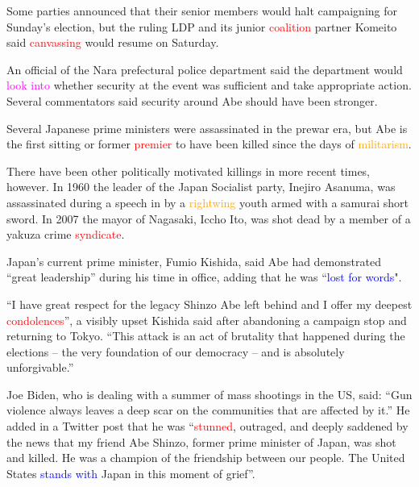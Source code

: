 \documentclass[12pt,a4paper]{article}
\begin{document}
    \par Some parties announced that their senior members would halt campaigning for Sunday’s election, but the ruling LDP and its junior \textcolor{red}{coalition}\cite{coalition} partner Komeito said \textcolor{red}{canvassing}\cite{canvassing} would resume on Saturday.

    \par An official of the Nara prefectural police department said the department would \textcolor{magenta}{look into}\cite{look_into} whether security at the event was sufficient and take appropriate action. Several commentators said security around Abe should have been stronger.






    \par Several Japanese prime ministers were assassinated in the prewar era, but Abe is the first sitting or former \textcolor{red}{premier}\cite{premier} to have been killed since the days of \textcolor{orange}{militarism}\cite{militarism}.

    \par There have been other politically motivated killings in more recent times, however. In 1960 the leader of the Japan Socialist party, Inejiro Asanuma, was assassinated during a speech in by a \textcolor{orange}{rightwing}\cite{rightwing} youth armed with a samurai short sword. In 2007 the mayor of Nagasaki, Iccho Ito, was shot dead by a member of a yakuza crime \textcolor{red}{syndicate}\cite{syndicate}.

    \par Japan’s current prime minister, Fumio Kishida, said Abe had demonstrated “great leadership” during his time in office, adding that he was “\textcolor{blue}{lost for words}"\cite{lost_for_words}.

    \par “I have great respect for the legacy Shinzo Abe left behind and I offer my deepest \textcolor{red}{condolences}\cite{condolences}”, a visibly upset Kishida said after abandoning a campaign stop and returning to Tokyo. “This attack is an act of brutality that happened during the elections – the very foundation of our democracy – and is absolutely unforgivable.”

    \par Joe Biden, who is dealing with a summer of mass shootings in the US, said: “Gun violence always leaves a deep scar on the communities that are affected by it.” He added in a Twitter post that he was “\textcolor{red}{stunned}\cite{stunned}, outraged, and deeply saddened by the news that my friend Abe Shinzo, former prime minister of Japan, was shot and killed. He was a champion of the friendship between our people. The United States \textcolor{blue}{stands with}\cite{stands_with} Japan in this moment of grief”.
\end{document}
